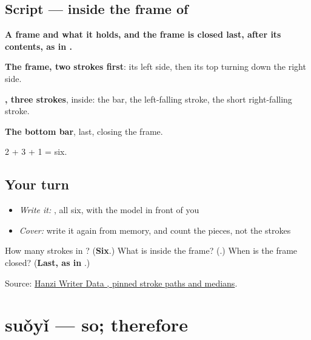 \subsection*{Script —  inside the frame of }

\begin{quote}
\end{quote}

\textbf{A frame and what it holds, and the frame is closed last, after its contents, as in .}

\textbf{The frame, two strokes first}: its left side, then its top turning down the right side.

\textbf{, three strokes}, inside: the bar, the left-falling stroke, the short right-falling stroke.

\textbf{The bottom bar}, last, closing the frame.

2 + 3 + 1 = six.

\subsection*{Your turn}
\begin{itemize}
\raggedright
  \item \emph{Write it:} , all six, with the model in front of you
  \item \emph{Cover:} write it again from memory, and count the pieces, not the strokes
\end{itemize}

\begin{tcolorbox}[breakable,colback=teal!4,colframe=teal!35!black,title={Before you move on}]
How many strokes in ? (\textbf{Six}.) What is inside the frame? (\textbf{}.) When is the frame closed? (\textbf{Last, as in }.)

Source: \href{https://raw.githubusercontent.com/chanind/hanzi-writer-data/68d10a4b21150cae5e1ebbd223eed289cf32d90c/data/\%E5\%9B\%A0.json}{Hanzi Writer Data , pinned stroke paths and medians}.
\end{tcolorbox}
\section[suǒyǐ]{suǒyǐ — so; therefore}

\label{lesson:ZH-C96-suoyi}




